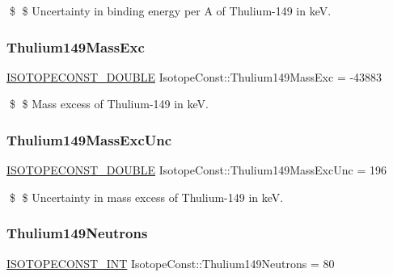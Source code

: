 \$ \$ Uncertainty in binding energy per A of Thulium-\/149 in keV. \mbox{\label{group___isotope_const-_thulium-_tm149_ga783d729cfa2388b03ec31eb4f91a7000}} 
\subsubsection{\texorpdfstring{Thulium149\+Mass\+Exc}{Thulium149MassExc}}
{\footnotesize\ttfamily \mbox{\hyperlink{group___isotope_const-_macros_ga8f45a7272ce02c0b4c65c44636ed719a}{I\+S\+O\+T\+O\+P\+E\+C\+O\+N\+S\+T\+\_\+\+D\+O\+U\+B\+LE}} Isotope\+Const\+::\+Thulium149\+Mass\+Exc = -\/43883}

\$ \$ Mass excess of Thulium-\/149 in keV. \mbox{\label{group___isotope_const-_thulium-_tm149_gaffd9a5595dbc2bd9b52839a6ec879d2f}} 
\subsubsection{\texorpdfstring{Thulium149\+Mass\+Exc\+Unc}{Thulium149MassExcUnc}}
{\footnotesize\ttfamily \mbox{\hyperlink{group___isotope_const-_macros_ga8f45a7272ce02c0b4c65c44636ed719a}{I\+S\+O\+T\+O\+P\+E\+C\+O\+N\+S\+T\+\_\+\+D\+O\+U\+B\+LE}} Isotope\+Const\+::\+Thulium149\+Mass\+Exc\+Unc = 196}

\$ \$ Uncertainty in mass excess of Thulium-\/149 in keV. \mbox{\label{group___isotope_const-_thulium-_tm149_ga099d5e2ef2988f795fbaec38fca88e5f}} 
\subsubsection{\texorpdfstring{Thulium149\+Neutrons}{Thulium149Neutrons}}
{\footnotesize\ttfamily \mbox{\hyperlink{group___isotope_const-_macros_ga5f18360b3e99483a35c32d789e62621c}{I\+S\+O\+T\+O\+P\+E\+C\+O\+N\+S\+T\+\_\+\+I\+NT}} Isotope\+Const\+::\+Thulium149\+Neutrons = 80}

